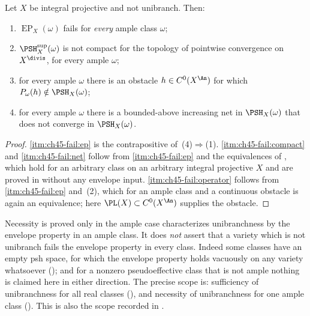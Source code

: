 \begin{corollary}
\label{cor:ch45-failure-nonunibranch}
Let $X$ be integral projective and not unibranch.  Then:
\begin{enumerate}
\item\label{itm:ch45-fail:ep}
      $\operatorname{EP}_X(\omega)$ fails for \emph{every} ample class
      $\omega$;
\item\label{itm:ch45-fail:compact}
      $\PSH^{\sup}_X(\omega)$ is not compact for the topology of
      pointwise convergence on $X^{\divis}$, for every ample $\omega$;
\item\label{itm:ch45-fail:operator}
      for every ample $\omega$ there is an obstacle
      $h\in C^0(X^{\An})$ for which $P_\omega(h)\notin\PSH_X(\omega)$;
\item\label{itm:ch45-fail:net}
      for every ample $\omega$ there is a bounded-above increasing net in
      $\PSH_X(\omega)$ that does not converge in $\PSH_X(\omega)$.
\end{enumerate}
\end{corollary}

\begin{proof}
\cref{itm:ch45-fail:ep} is the contrapositive of
\,(4)$\Rightarrow$(1).
\cref{itm:ch45-fail:compact} and \cref{itm:ch45-fail:net} follow from
\cref{itm:ch45-fail:ep} and the equivalences of
, which hold for an arbitrary class on an
arbitrary integral projective $X$ and are proved in
 without any envelope input.
\cref{itm:ch45-fail:operator} follows from \cref{itm:ch45-fail:ep} and
\,(2), which for an ample class and a
continuous obstacle is again an equivalence; here $\PL(X)\subset
C^0(X^{\An})$ supplies the obstacle.
\end{proof}

\begin{warning}{Necessity is proved only in the ample case}
\label{warn:ch45-necessity-ample}
 characterizes unibranchness
by the envelope property in an ample class.  It does \emph{not} assert that
a variety which is not unibranch fails the envelope property in every class.
Indeed some classes have an empty psh space, for which the envelope property
holds vacuously on any variety whatsoever
(); and for a nonzero pseudoeffective class that
is not ample nothing is claimed here in either direction.  The precise
scope is: sufficiency of unibranchness for all real classes
(), and necessity of unibranchness for one
ample class ().  This is also the scope
recorded in .
\end{warning}

